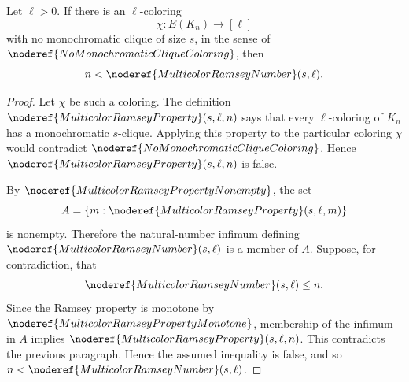 \begin{helper}
Let \(\ell>0\).  If there is an \(\ell\)-coloring
\[
  \chi:E(K_n)\to[\ell]
\]
with no monochromatic clique of size \(s\), in the sense of
\(\noderef{NoMonochromaticCliqueColoring}\), then
\[
  n<\noderef{MulticolorRamseyNumber}(s,\ell).
\]
\end{helper}
\begin{proof}
Let \(\chi\) be such a coloring.  The definition
\(\noderef{MulticolorRamseyProperty}(s,\ell,n)\) says that every
\(\ell\)-coloring of \(K_n\) has a monochromatic \(s\)-clique.  Applying this
property to the particular coloring \(\chi\) would contradict
\(\noderef{NoMonochromaticCliqueColoring}\).  Hence
\(\noderef{MulticolorRamseyProperty}(s,\ell,n)\) is false.

By \(\noderef{MulticolorRamseyPropertyNonempty}\), the set
\[
  A=\{m:\noderef{MulticolorRamseyProperty}(s,\ell,m)\}
\]
is nonempty.  Therefore the natural-number infimum defining
\(\noderef{MulticolorRamseyNumber}(s,\ell)\) is a member of \(A\).  Suppose,
for contradiction, that
\[
  \noderef{MulticolorRamseyNumber}(s,\ell)\le n.
\]
Since the Ramsey property is monotone by
\(\noderef{MulticolorRamseyPropertyMonotone}\), membership of the infimum in
\(A\) implies \(\noderef{MulticolorRamseyProperty}(s,\ell,n)\).  This
contradicts the previous paragraph.  Hence the assumed inequality is false,
and so \(n<\noderef{MulticolorRamseyNumber}(s,\ell)\).
\end{proof}

